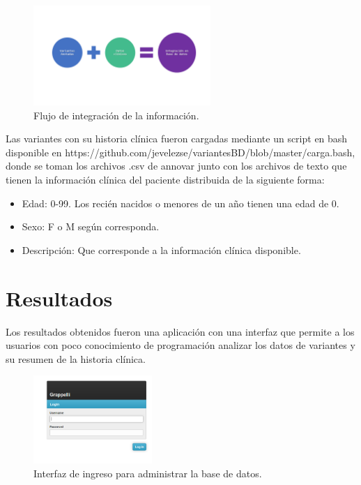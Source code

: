 \begin{figure}[H] 
	\centering
	\includegraphics[width=0.6\textwidth]{Kap3/flujo2}
	\caption{Flujo de integración de la información.} 
	\label{fig:flujo2}
\end{figure}

Las variantes con su historia clínica fueron cargadas mediante un script en bash disponible en https://github.com/jevelezse/variantesBD/blob/master/carga.bash, donde se toman los archivos .csv de annovar junto con los archivos de texto que tienen la información clínica del paciente distribuida de la siguiente forma:

\begin{itemize}
	\item Edad: 0-99. Los recién nacidos  o menores de un año tienen una edad de 0.
	\item Sexo: F o M según corresponda.
	\item Descripción: Que corresponde a la información clínica disponible.
\end{itemize} 

\section{Resultados} 

Los resultados obtenidos fueron una aplicación con una interfaz que permite a los usuarios con poco conocimiento de  programación  analizar los datos de variantes y su resumen de la historia clínica. \\

\begin{figure}[h] 
	\centering
	\includegraphics[width=0.4\textwidth]{Kap3/admin_django}
	\caption{Interfaz de ingreso para  administrar la base de datos.} \label{fig:admin}
\end{figure}

